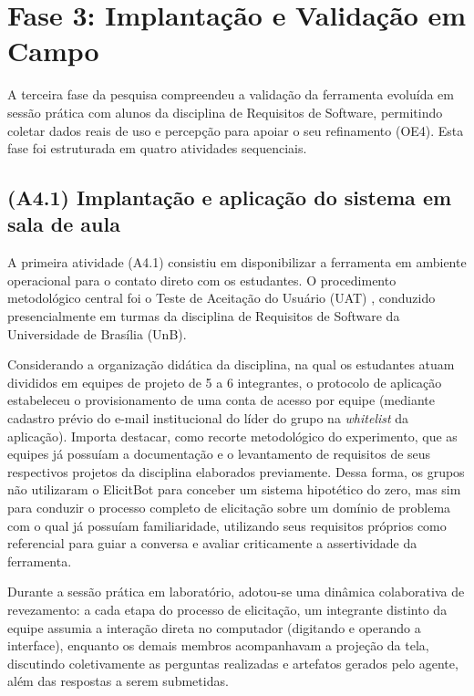 \section{Fase 3: Implantação e Validação em Campo}
\label{sec:fase3}

A terceira fase da pesquisa compreendeu a validação da ferramenta evoluída em sessão prática com alunos da disciplina de Requisitos de Software, permitindo coletar dados reais de uso e percepção para apoiar o seu refinamento (OE4). Esta fase foi estruturada em quatro atividades sequenciais.

\subsection{(A4.1) Implantação e aplicação do sistema em sala de aula}

A primeira atividade (A4.1) consistiu em disponibilizar a ferramenta em ambiente operacional para o contato direto com os estudantes. O procedimento metodológico central foi o Teste de Aceitação do Usuário (UAT) \cite{sommerville2016}, conduzido presencialmente em turmas da disciplina de Requisitos de Software da Universidade de Brasília (UnB).

Considerando a organização didática da disciplina, na qual os estudantes atuam divididos em equipes de projeto de 5 a 6 integrantes, o protocolo de aplicação estabeleceu o provisionamento de uma conta de acesso por equipe (mediante cadastro prévio do e-mail institucional do líder do grupo na \textit{whitelist} da aplicação). Importa destacar, como recorte metodológico do experimento, que as equipes já possuíam a documentação e o levantamento de requisitos de seus respectivos projetos da disciplina elaborados previamente. Dessa forma, os grupos não utilizaram o ElicitBot para conceber um sistema hipotético do zero, mas sim para conduzir o processo completo de elicitação sobre um domínio de problema com o qual já possuíam familiaridade, utilizando seus requisitos próprios como referencial para guiar a conversa e avaliar criticamente a assertividade da ferramenta.

Durante a sessão prática em laboratório, adotou-se uma dinâmica colaborativa de revezamento: a cada etapa do processo de elicitação, um integrante distinto da equipe assumia a interação direta no computador (digitando e operando a interface), enquanto os demais membros acompanhavam a projeção da tela, discutindo coletivamente as perguntas realizadas e artefatos gerados pelo agente, além das respostas a serem submetidas.

